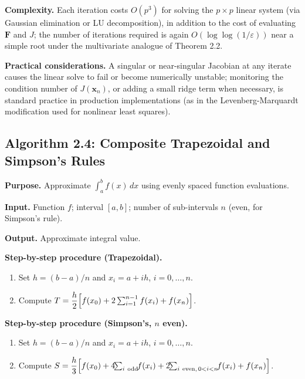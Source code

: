 \documentclass[
]{article}
\providecommand{\tightlist}{%
  \setlength{\itemsep}{0pt}\setlength{\parskip}{0pt}}
\begin{document}
\textbf{Complexity.} Each iteration costs \(O(p^3)\) for solving the
\(p\times p\) linear system (via Gaussian elimination or LU
decomposition), in addition to the cost of evaluating \(\mathbf F\) and
\(J\); the number of iterations required is again \(O(\log\log(1/
\varepsilon))\) near a simple root under the multivariate analogue of
Theorem 2.2.

\textbf{Practical considerations.} A singular or near-singular Jacobian
at any iterate causes the linear solve to fail or become numerically
unstable; monitoring the condition number of \(J(\mathbf x_n)\), or
adding a small ridge term when necessary, is standard practice in
production implementations (as in the Levenberg-Marquardt modification
used for nonlinear least squares).

\subsection{Algorithm 2.4: Composite Trapezoidal and Simpson's
Rules}\label{algorithm-2.4-composite-trapezoidal-and-simpsons-rules}

\textbf{Purpose.} Approximate \(\int_a^b f(x)\,dx\) using evenly spaced
function evaluations.

\textbf{Input.} Function \(f\); interval \([a,b]\); number of
sub-intervals \(n\) (even, for Simpson's rule).

\textbf{Output.} Approximate integral value.

\textbf{Step-by-step procedure (Trapezoidal).}

\begin{enumerate}
\def\labelenumi{\arabic{enumi}.}
\tightlist
\item
  Set \(h=(b-a)/n\) and \(x_i = a+ih\), \(i=0,\dots,n\).
\item
  Compute
  \(T = \dfrac{h}{2}\Bigl[f(x_0) + 2\sum_{i=1}^{n-1}f(x_i) + f(x_n)\Bigr]\).
\end{enumerate}

\textbf{Step-by-step procedure (Simpson's, \(n\) even).}

\begin{enumerate}
\def\labelenumi{\arabic{enumi}.}
\tightlist
\item
  Set \(h=(b-a)/n\) and \(x_i=a+ih\), \(i=0,\dots,n\).
\item
  Compute
  \(S = \dfrac{h}{3}\Bigl[f(x_0)+4\!\!\sum_{i\ \text{odd}}\!\!f(x_i)
  +2\!\!\sum_{i\ \text{even},\,0<i<n}\!\!f(x_i)+f(x_n)\Bigr]\).
\end{enumerate}
\end{document}
